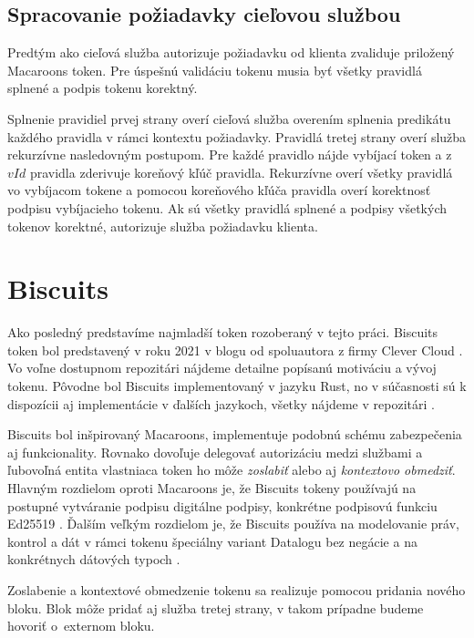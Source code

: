 \subsection{Spracovanie požiadavky cieľovou službou}

Predtým ako cieľová služba autorizuje požiadavku od klienta zvaliduje priložený Macaroons token. Pre úspešnú validáciu tokenu musia byť všetky pravidlá splnené a podpis tokenu korektný.

Splnenie pravidiel prvej strany overí cieľová služba overením splnenia predikátu každého pravidla v rámci kontextu požiadavky. Pravidlá tretej strany overí služba rekurzívne nasledovným postupom. Pre každé pravidlo nájde vybíjací token a z $vId$ pravidla zderivuje koreňový kľúč pravidla. Rekurzívne overí všetky pravidlá vo vybíjacom tokene a pomocou koreňového kľúča pravidla overí korektnosť podpisu vybíjacieho tokenu. Ak sú všetky pravidlá splnené a podpisy všetkých tokenov korektné, autorizuje služba požiadavku klienta.

\section{Biscuits}

Ako posledný predstavíme najmladší token rozoberaný v tejto práci. Biscuits token bol predstavený v roku 2021 v blogu od spoluautora z firmy Clever Cloud \cite{biscuits_blog}. Vo voľne dostupnom repozitári \cite{biscuits_git} nájdeme detailne popísanú motiváciu a vývoj tokenu. Pôvodne bol Biscuits implementovaný v jazyku Rust, no v súčasnosti sú k dispozícii aj implementácie v ďalších jazykoch, všetky nájdeme v repozitári \cite{biscuits_git}.

Biscuits bol inšpirovaný Macaroons, implementuje podobnú schému zabezpečenia aj funkcionality. Rovnako dovoľuje delegovať autorizáciu medzi službami a ľubovoľná entita vlastniaca token ho môže \textit{zoslabiť} alebo aj \textit{kontextovo obmedziť}. Hlavným rozdielom oproti Macaroons je, že Biscuits tokeny používajú na postupné vytváranie podpisu digitálne podpisy, konkrétne podpisovú funkciu Ed25519 \cite{ed_rfc}. Ďalším veľkým rozdielom je, že Biscuits používa na modelovanie práv, kontrol a dát v rámci tokenu špeciálny variant Datalogu bez negácie a na konkrétnych dátových typoch \cite{datalog_bis}.

Zoslabenie a kontextové obmedzenie tokenu sa realizuje pomocou pridania nového bloku. Blok môže pridať aj služba tretej strany, v takom prípadne budeme hovoriť o~externom bloku.

